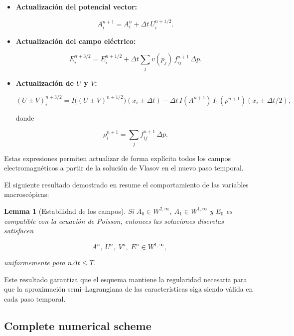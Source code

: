 \documentclass[11pt,a4paper,twoside,pdf]{article}
\numberwithin{equation}{section}
\newtheorem{lemma}[theorem]{Lemma}
\begin{document}
\begin{itemize}
\item \textbf{Actualización del potencial vector:}


\[
A^{n+1}_i = A^n_i + \Delta t\,U^{n+1/2}_i.
\]



\item \textbf{Actualización del campo eléctrico:}


\[
E^{n+3/2}_i = E^{n+1/2}_i + \Delta t\sum_j v(p_j)\,f^{n+1}_{ij}\,\Delta p.
\]



\item \textbf{Actualización de $U$ y $V$:}


\[
(U\pm V)^{n+3/2}_i =
I\big((U\pm V)^{n+1/2}\big)(x_i\pm\Delta t)
-\Delta t\,I(A^{n+1})\,I_1(\rho^{n+1})(x_i\pm\Delta t/2),
\]


donde


\[
\rho^{n+1}_i = \sum_j f^{n+1}_{ij}\,\Delta p.
\]


\end{itemize}

Estas expresiones permiten actualizar de forma explícita todos los campos
electromagnéticos a partir de la solución de Vlasov en el nuevo paso temporal.


El siguiente resultado demostrado en \cite{bostan2009convergence} resume el comportamiento de las variables macroscópicas:

\begin{lemma}[Estabilidad de los campos]
Si $A_0\in W^{2,\infty}$, $A_1\in W^{1,\infty}$ y $E_0$ es compatible con la ecuación
de Poisson, entonces las soluciones discretas satisfacen


\[
A^n,\; U^n,\; V^n,\; E^n \in W^{1,\infty},
\]


uniformemente para $n\Delta t\le T$.
\end{lemma}

Este resultado garantiza que el esquema mantiene la regularidad necesaria para que
la aproximación semi--Lagrangiana de las características siga siendo válida en cada
paso temporal.

\medskip




\subsection{Complete numerical scheme}
\end{document}
